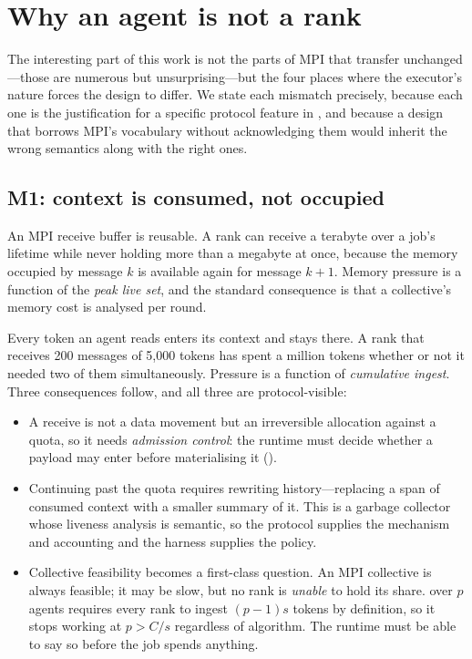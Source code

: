 \section{Why an agent is not a rank}
\label{sec:mismatch}

The interesting part of this work is not the parts of MPI that transfer
unchanged---those are numerous but unsurprising---but the four places where
the executor's nature forces the design to differ. We state each mismatch
precisely, because each one is the justification for a specific protocol
feature in , and because a design that borrows MPI's
vocabulary without acknowledging them would inherit the wrong semantics
along with the right ones.

\subsection{M1: context is consumed, not occupied}
\label{sec:m1}

An MPI receive buffer is reusable. A rank can receive a terabyte over a
job's lifetime while never holding more than a megabyte at once, because
the memory occupied by message $k$ is available again for message $k+1$.
Memory pressure is a function of the \emph{peak live set}, and the standard
consequence is that a collective's memory cost is analysed per round.

Every token an agent reads enters its context and stays there. A rank that
receives 200 messages of 5{,}000 tokens has spent a million tokens whether
or not it needed two of them simultaneously. Pressure is a function of
\emph{cumulative ingest}. Three consequences follow, and all three are
protocol-visible:

\begin{itemize}
\item A receive is not a data movement but an irreversible allocation
against a quota, so it needs \emph{admission control}: the runtime must
decide whether a payload may enter before materialising it
().
\item Continuing past the quota requires rewriting history---replacing a
span of consumed context with a smaller summary of it. This is a garbage
collector whose liveness analysis is semantic, so the protocol supplies the
mechanism and accounting and the harness supplies the policy.
\item Collective feasibility becomes a first-class question. An MPI
collective is always feasible; it may be slow, but no rank is \emph{unable}
to hold its share.  over $p$ agents requires every rank to
ingest $(p-1)s$ tokens by definition, so it stops working at
$p > C/s$ regardless of algorithm. The runtime must be able to say so before
the job spends anything.
\end{itemize}

